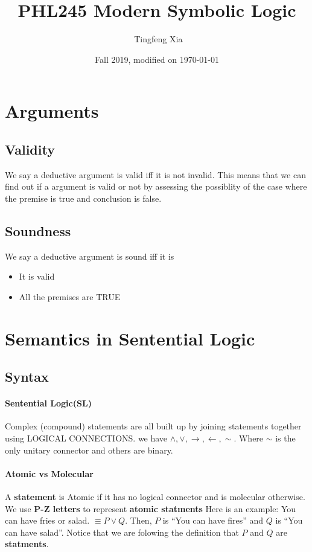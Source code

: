 \documentclass[11pt]{article}
\title{PHL245 Modern Symbolic Logic}
\author{\ccLogo \,\,Tingfeng Xia}
\date{Fall 2019, modified on \today}
\begin{document}
\maketitle
\doclicenseThis
\tableofcontents
\newpage

\section{Arguments}
\subsection{Validity}
We say a deductive argument is valid iff it is not invalid. This means that we can
find out if a argument is valid or not by assessing the possiblity of the case where 
the premise is true and conclusion is false.
\subsection{Soundness}
We say a deductive argument is sound iff it is 
\begin{itemize}
    \item It is valid
    \item All the premises are TRUE
\end{itemize}

\section{Semantics in Sentential Logic}
\subsection{Syntax}
\paragraph{Sentential Logic(SL)} Complex (compound) statements are all built up by joining statements together using LOGICAL CONNECTIONS.
we have $\wedge, \vee, \rightarrow, \leftarrow, \sim$. Where $\sim$ is the only unitary connector and others are binary.

\paragraph{Atomic vs Molecular} A \textbf{statement} is Atomic if it has no logical connector and is molecular otherwise. We use \textbf{P-Z letters} to represent \textbf{atomic statments}
Here is an example: You can have fries or salad. $\equiv P \vee Q.$ Then, $P$ is ``You can have fires'' and $Q$ is ``You can have salad''. Notice that we are folowing the definition that $P$ and $Q$ are \textbf{statments}.
\end{document}
